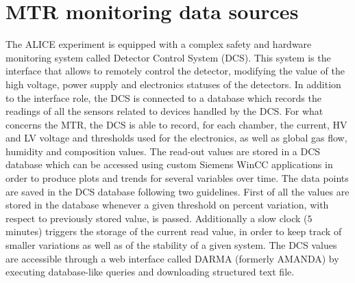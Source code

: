 \section{MTR monitoring data sources}
The ALICE experiment is equipped with a complex safety and hardware monitoring system called Detector Control System (DCS).
This system is the interface that allows to remotely control the detector, modifying the value of the high voltage, power supply and electronics statuses of the detectors.
In addition to the interface role, the DCS is connected to a database which records the readings of all the sensors related to devices handled by the DCS.
For what concerns the MTR, the DCS is able to record, for each chamber, the current, HV and LV voltage and thresholds used for the electronics, as well as global gas flow, humidity and composition values.
The read-out values are stored in a DCS database which can be accessed using custom Siemens WinCC applications in order to produce plots and trends for several variables over time.
The data points are saved in the DCS database following two guidelines.
First of all the values are stored in the database whenever a given threshold on percent variation, with respect to previously stored value, is passed.
Additionally a slow clock ($5$ minutes) triggers the storage of the current read value, in order to keep track of smaller variations as well as of the stability of a given system.
The DCS values are accessible through a web interface called DARMA (formerly AMANDA) by executing database-like queries and downloading structured text file.


